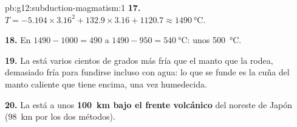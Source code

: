 \begin{solution}{pb:g12:subduction-magmatism:1}
\textbf{17.} $T = -5.104 \times 3.16^2 + 132.9 \times 3.16 + 1120.7 \approx
\qty{1490}{\celsius}$.

\textbf{18.} En $1490 - 1000 = 490$ a $1490 - 950 = \qty{540}{\celsius}$:
unos \qty{500}{\celsius}.

\textbf{19.} La  está varios cientos de grados más fría que el manto que
la rodea, demasiado fría para fundirse incluso con agua: lo que se funde es la
cuña del manto caliente que tiene encima, una vez humedecida.

\textbf{20.} La  está a unos \textbf{\qty{100}{km} bajo el frente
volcánico} del noreste de Japón (\qty{98}{km} por los dos métodos).
\end{solution}
